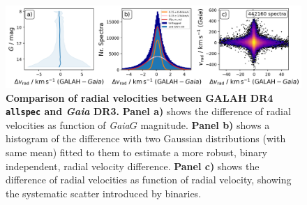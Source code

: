 \documentclass[
  journal=pasa,
  manuscript=research-paper, %
  year=2024,
  volume=37
]{cup-journal}
\newcommand{\Gaia}{\textit{Gaia}\xspace}
\begin{document}
\begin{figure}[ht]
 \centering
 \includegraphics[width=\textwidth]{figures/galah_dr4_vrad_gaia_dr3.png}
 \caption{\textbf{Comparison of radial velocities between GALAH DR4 \texttt{allspec} and \Gaia DR3.}
 \textbf{Panel a)} shows the difference of radial velocities as function of \Gaia $G$ magnitude.
 \textbf{Panel b)} shows a histogram of the difference with two Gaussian distributions (with same mean) fitted to them to estimate a more robust, binary independent, radial velocity difference.
 \textbf{Panel c)} shows the difference of radial velocities as function of radial velocity, showing the systematic scatter introduced by binaries.
}
 \label{fig:galah_dr4_vrad_gaia_dr3}
\end{figure}
\end{document}
